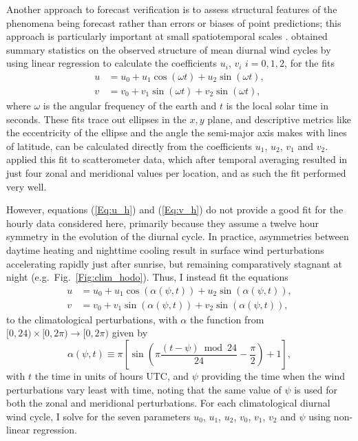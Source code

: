\documentclass[twocol]{ametsoc}
\begin{document}
Another approach to forecast verification is to assess structural features of the phenomena being forecast rather than errors or biases of point predictions; this approach is particularly important at small spatiotemporal scales \citep[e.g.][]{mass02, rife05}. \citet{gille05} obtained summary statistics on the observed structure of mean diurnal wind cycles by using linear regression to calculate the coefficients $u_i$, $v_i$ $i=0,1,2$, for the fits 
\begin{align}
u &= u_0 + u_1 \cos(\omega t) + u_2 \sin(\omega t), \label{Eq:u_h} \\
v &= v_0 + v_1 \sin(\omega t) + v_2 \sin(\omega t), \label{Eq:v_h}
\end{align}
where $\omega$ is the angular frequency of the earth and $t$ is the local solar time in seconds. These fits trace out ellipses in the $x,y$ plane, and descriptive metrics like the eccentricity of the ellipse and the angle the semi-major axis makes with lines of latitude, can be calculated directly from the coefficients $u_1$, $u_2$, $v_1$ and $v_2$. \citet{gille05} applied this fit to scatterometer data, which after temporal averaging resulted in just four zonal and meridional values per location, and as such the fit performed very well.  

However, equations (\ref{Eq:u_h}) and (\ref{Eq:v_h}) do not provide a good fit for the hourly data considered here, primarily because they assume a twelve hour symmetry in the evolution of the diurnal cycle. In practice, asymmetries between daytime heating and nighttime cooling \citep[e.g.][]{svensson11} result in surface wind perturbations accelerating rapidly just after sunrise, but remaining comparatively stagnant at night (e.g.~Fig.~\ref{Fig:clim_hodo}). Thus, I instead fit the equations
\begin{align}
u &= u_0 + u_1 \cos(\alpha(\psi,t)) + u_2 \sin(\alpha(\psi,t)), \label{Eq:u} \\
v &= v_0 + v_1 \sin(\alpha(\psi,t)) + v_2 \sin(\alpha(\psi,t)), \label{Eq:v}
\end{align}
to the climatological perturbations, with $\alpha$ the function from $[0,24) \times [0, 2\pi) \to [0, 2\pi)$ given by
\begin{equation}
\alpha(\psi,t) \equiv \pi \left[\sin\left( \pi \frac{(t - \psi)  \bmod 24}{24} - \frac{\pi}{2} \right) + 1 \right], \label{Eq:alpha}
\end{equation}
with $t$ the time in units of hours UTC, and $\psi$ providing the time when the wind perturbations vary least with time, noting that the same value of $\psi$ is used for both the zonal and meridional perturbations. For each climatological diurnal wind cycle, I solve for the seven parameters $u_0$, $u_1$, $u_2$, $v_0$, $v_1$, $v_2$ and $\psi$ using non-linear regression.
\end{document}
